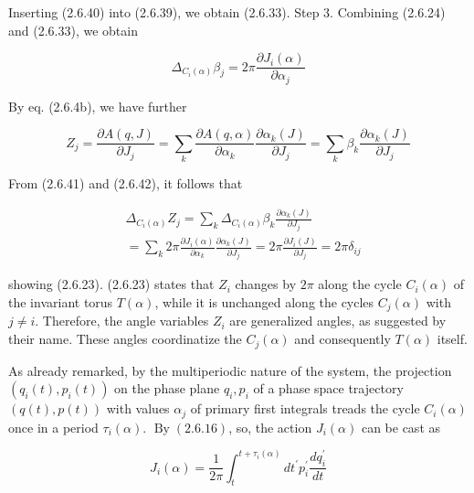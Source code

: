 \documentclass{article}
\begin{document}
Inserting (2.6.40) into (2.6.39), we obtain (2.6.33).
Step 3. Combining (2.6.24) and (2.6.33), we obtain
 
\begin{equation*}
\Delta_{C_{i}(\alpha)} \beta_{j}=2 \pi \frac{\partial J_{i}(\alpha)}{\partial \alpha_{j}} \tag{2.6.41}
\end{equation*}
 

By eq. (2.6.4b), we have further
 
\begin{equation*}
Z_{j}=\frac{\partial A(q, J)}{\partial J_{j}}=\sum_{k} \frac{\partial A(q, \alpha)}{\partial \alpha_{k}} \frac{\partial \alpha_{k}(J)}{\partial J_{j}}=\sum_{k} \beta_{k} \frac{\partial \alpha_{k}(J)}{\partial J_{j}} \tag{2.6.42}
\end{equation*}
 

From (2.6.41) and (2.6.42), it follows that
 
\begin{align*}
& \Delta_{C_{i}(\alpha)} Z_{j}=\sum_{k} \Delta_{C_{i}(\alpha)} \beta_{k} \frac{\partial \alpha_{k}(J)}{\partial J_{j}}  \tag{2.6.43}\\
&=\sum_{k} 2 \pi \frac{\partial J_{i}(\alpha)}{\partial \alpha_{k}} \frac{\partial \alpha_{k}(J)}{\partial J_{j}}=2 \pi \frac{\partial J_{i}(J)}{\partial J_{j}}=2 \pi \delta_{i j}
\end{align*}
 
showing (2.6.23).
(2.6.23) states that $Z_{i}$ changes by $2 \pi$ along the cycle $C_{i}(\alpha)$ of the invariant torus $T(\alpha)$, while it is unchanged along the cycles $C_{j}(\alpha)$ with $j \neq i$. Therefore, the
angle variables $Z_{i}$ are generalized angles, as suggested by their name. These angles coordinatize the $C_{j}(\alpha)$ and consequently $T(\alpha)$ itself.

As already remarked, by the multiperiodic nature of the system, the projection $\left(q_{i}(t), p_{i}(t)\right)$ on the phase plane $q_{i}, p_{i}$ of a phase space trajectory $(q(t), p(t))$ with values $\alpha_{j}$ of primary first integrals treads the cycle $C_{i}(\alpha)$ once in a period $\tau_{i}(\alpha)$. $\operatorname{By}(2.6 .16)$, so, the action $J_{i}(\alpha)$ can be cast as
 
\begin{equation*}
J_{i}(\alpha)=\frac{1}{2 \pi} \int_{t}^{t+\tau_{i}(\alpha)} d t^{\prime} p_{i}^{\prime} \frac{d q_{i}^{\prime}}{d t} \tag{2.6.44}
\end{equation*}
 
\end{document}
